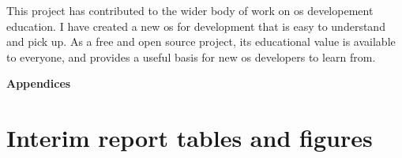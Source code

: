 \documentclass{article}
\begin{document}
This project has contributed to the wider body of work on \gls{os} developement
education. I have created a new \gls{os} for development that is easy to
understand and pick up. As a free and open source project, its educational
value is available to everyone, and provides a useful basis for new \gls{os}
developers to learn from.

















\clearpage


\printglossaries

\nocite{osdev-wiki}
\nocite{unix-prog-env}
\printbibliography[heading=bibintoc]


































\clearpage
\appendix
{}
\newrefsection
{}
\renewcommand{\thesubsection}{\Alph{subsection}}
\renewcommand{\thesubsubsection}{\thesubsection.\alph{subsubsection}}

{\Large\bfseries Appendices\vspace{2ex}}

\section{Interim report tables and figures}
\end{document}
